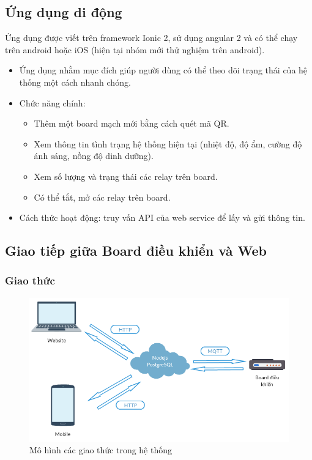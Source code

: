 \documentclass[a4paper,12pt,oneside]{article}
\begin{document}
\subsection{Ứng dụng di động}
\noindent Ứng dụng được viết trên framework Ionic 2, sử dụng angular 2 và có thể chạy trên android hoặc iOS (hiện tại nhóm mới thử nghiệm trên android). 
\begin{itemize}
\item Ứng dụng nhằm mục đích giúp người dùng có thể theo dõi trạng thái của hệ thống một cách nhanh chóng.
\item Chức năng chính:
\begin{itemize}
\item Thêm một board mạch mới bằng cách quét mã QR. 
\item Xem thông tin tình trạng hệ thống hiện tại (nhiệt độ, độ ẩm, cường độ ánh sáng, nồng độ dinh dưỡng).
\item Xem số lượng và trạng thái các relay trên board. 
\item Có thể tắt, mở các relay trên board.
\end{itemize}
\item Cách thức hoạt động: truy vấn API của web service để lấy và gửi thông tin.
\end{itemize}

\subsection{Giao tiếp giữa Board điều khiển và Web}
\subsubsection{Giao thức}

\begin{figure}[H]
	\centering
	\includegraphics[scale=.5]{hinh/system-protocol.png}
	\caption{Mô hình các giao thức trong hệ thống}
\end{figure}
\end{document}
